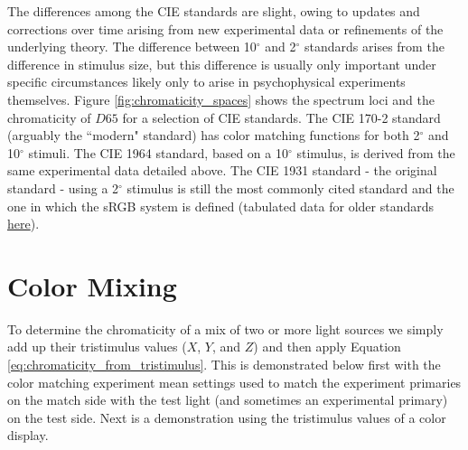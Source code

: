 \documentclass{article}
\begin{document}
\begin{multicols}{2}
The differences among the CIE standards are slight, owing to updates and corrections over time arising from new experimental data or refinements of the underlying theory.  The difference between 10$^\circ$ and 2$^\circ$ standards arises from the difference in stimulus size, but this difference is usually only important under specific circumstances likely only to arise in psychophysical experiments themselves.  Figure \ref{fig:chromaticity_spaces} shows the spectrum loci and the chromaticity of $D65$ for a selection of CIE standards.  The CIE 170-2 standard (arguably the ``modern" standard) has color matching functions for both 2$^\circ$ and 10$^\circ$ stimuli.  The CIE 1964 standard, based on a 10$^\circ$ stimulus, is derived from the same experimental data detailed above.  The CIE 1931 standard - the original standard - using a 2$^\circ$ stimulus is still the most commonly cited standard and the one in which the sRGB system is defined (tabulated data for older standards \href{http://www.cvrl.org/cie.htm}{here}).


\section{Color Mixing} \label{sec:color_mixing}

To determine the chromaticity of a mix of two or more light sources we simply add up their tristimulus values ($X$, $Y$, and $Z$) and then apply Equation \ref{eq:chromaticity_from_tristimulus}.  This is demonstrated below first with the color matching experiment mean settings used to match the experiment primaries on the match side with the test light (and sometimes an experimental primary) on the test side.  Next is a demonstration using the tristimulus values of a color display.


\end{multicols}
\end{document}
